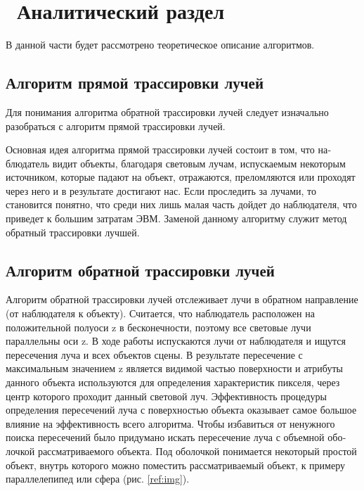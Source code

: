 \chapter{ Аналитический раздел}
\label{cha:analysis}

В данной части будет рассмотрено теоретическое описание алгоритмов.

\section{Алгоритм прямой трассировки лучей}

Для понимания алгоритма обратной трассировки лучей следует изначально разобраться с
алгоритм прямой трассировки лучей.

Основная идея алгоритма прямой трассировки лучей состоит в том, что на­ блюдатель 
видит объекты, благодаря световым лучам, испускаемым некоторым ис­точником,
которые падают на объект, отражаются, преломляются или проходят че­рез
него и в результате достигают нас. Если проследить за лучами, то становится
понятно, что среди них лишь малая часть дойдет до наблюдателя, что приведет к
большим затратам ЭВМ. Заменой данному алгоритму служит метод обратный трас­сировки лучшей.

\section{Алгоритм обратной трассировки лучей}

Алгоритм обратной трассировки лучей отслеживает лучи в обратном направ­ление (от наблюдателя к объекту).
Считается, что наблюдатель расположен на положительной полуоси z в бес­конечности,
поэтому все световые лучи параллельны оси z. В ходе работы испуска­ются
лучи от наблюдателя и ищутся пересечения луча и всех объектов сцены.
В результате пересечение с максимальным значением z является видимой частью
поверхности и атрибуты данного объекта используются для определения характери­стик
пикселя, через центр которого проходит данный световой луч. Эффективность
процедуры определения пересечений луча с поверхностью объекта оказывает самое
большое влияние на эффективность всего алгоритма. Чтобы избавиться от ненуж­ного
поиска пересечений было придумано искать пересечение луча с объемной обо­лочкой
рассматриваемого объекта. Под оболочкой понимается некоторый простой
объект, внутрь которого можно поместить рассматриваемый объект, к примеру па­раллелепипед или сфера (рис. \ref{ref:img}).

\begin{figure}[ht!]
\end{figure}

